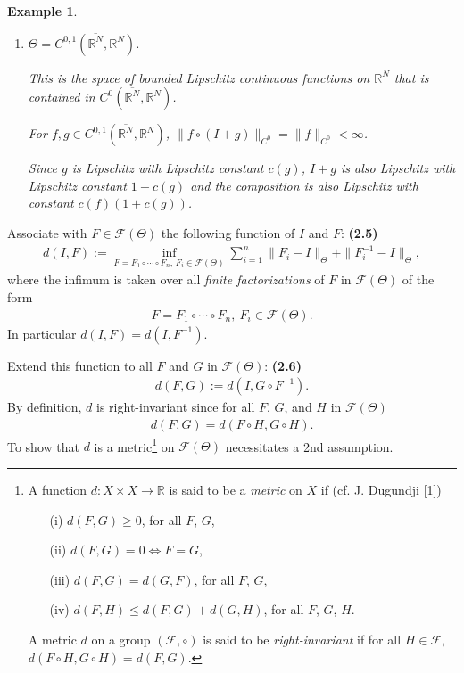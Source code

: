 \documentclass{book}
\numberwithin{equation}{section}
\newtheorem{example}{Example}[section]
\begin{document}
\begin{enumerate}
\begin{example}
\begin{enumerate}
            In conclusion for all $\varepsilon > 0$, there exists $\rho > 0$ s.t. for all $x$ s.t. $|x| > \rho$, $|g(x + f(x))| < \varepsilon$ and $g\circ(I + f)\in C_0^0(\mathbb{R}^N,\mathbb{R}^N)$.
            \item $\Theta = C^{0,1}(\overline{\mathbb{R}^N},\mathbb{R}^N)$.
            
            This is the space of bounded Lipschitz continuous functions on $\mathbb{R}^N$ that is contained in $C^0(\overline{\mathbb{R}^N},\mathbb{R}^N)$.
            
            For $f,g\in C^{0,1}(\overline{\mathbb{R}^N},\mathbb{R}^N)$, $\|f\circ(I + g)\|_{C^0} = \|f\|_{C^0} < \infty$.
            
            Since $g$ is Lipschitz with Lipschitz constant $c(g)$, $I + g$ is also Lipschitz with Lipschitz constant $1 + c(g)$ and the composition is also Lipschitz with constant $c(f)(1 + c(g))$.
        \end{enumerate}
    \end{example}
    Associate with $F\in\mathcal{F}(\Theta)$ the following function of $I$ and $F$: \textbf{(2.5)}
    \begin{align*}
        d(I,F) := \inf_{F = F_1\circ\cdots\circ F_n,\, F_i\in\mathcal{F}(\Theta)} \sum_{i=1}^n \|F_i - I\|_\Theta + \|F_i^{-1} - I\|_\Theta,
    \end{align*}
    where the infimum is taken over all \textit{finite factorizations} of $F$ in $\mathcal{F}(\Theta)$ of the form
    \begin{align*}
        F = F_1\circ\cdots\circ F_n,\ F_i\in\mathcal{F}(\Theta).
    \end{align*}
    In particular $d(I,F) = d(I,F^{-1})$.
    
    Extend this function to all $F$ and $G$ in $\mathcal{F}(\Theta)$: \textbf{(2.6)}
    \begin{align*}
        d(F,G) := d\left(I,G\circ F^{-1}\right).
    \end{align*}
    By definition, $d$ is right-invariant since for all $F$, $G$, and $H$ in $\mathcal{F}(\Theta)$
    \begin{align*}
        d(F,G) = d\left(F\circ H,G\circ H\right).
    \end{align*}
    To show that $d$ is a metric\footnote{A function $d:X\times X\to\mathbb{R}$ is said to be a \textit{metric} on $X$ if (cf. J. Dugundji [1])
        \begin{itemize}
            \item[(i)] $d(F,G)\ge 0$, for all $F$, $G$,
            \item[(ii)] $d(F,G) = 0\Leftrightarrow F = G$,
            \item[(iii)] $d(F,G) = d(G,F)$, for all $F$, $G$,
            \item[(iv)] $d(F,H)\le d(F,G) + d(G,H)$, for all $F$, $G$, $H$. 
        \end{itemize}
        A metric $d$ on a group $(\mathcal{F},\circ)$ is said to be \textit{right-invariant} if for all $H\in\mathcal{F}$, $d(F\circ H,G\circ H) = d(F,G)$.} on $\mathcal{F}(\Theta)$ necessitates a 2nd assumption.
    

\end{enumerate}
\end{document}
